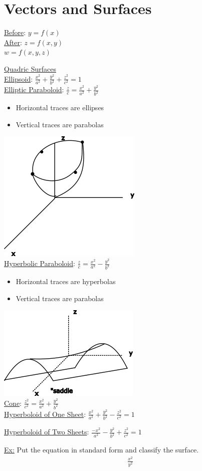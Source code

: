 \documentclass[12pt]{article}
\begin{document}
\section{Vectors and Surfaces}

\underline{Before}: \(y=f(x)\) \\%
\underline{After}: \(z=f(x,y)\) \\%
\(w = f(x,y,z)\) 


\underline{Quadric Surfaces}\\%
\underline{Ellipsoid}: $\frac{x^2}{a^2}+\frac{y^2}{b^2}+\frac{z^2}{c^2}=1$\\%
\underline{Elliptic Paraboloid}: $\frac{z}{c}=\frac{x^2}{a^2}+\frac{y^2}{b^2}$
\begin{itemize}
	\item Horizontal traces are ellipses
	\item Vertical traces are parabolas
\end{itemize}
\includegraphics{parabaloid}\\%
\underline{Hyperbolic Paraboloid}: $\frac{z}{c}=\frac{x^2}{a^2}-\frac{y^2}{b^2}$
\begin{itemize}
	\item Horizontal traces are hyperbolas
	\item Vertical traces are parabolas
\end{itemize}
\includegraphics{saddle}\\%
\underline{Cone}: $\frac{z^2}{c^2}=\frac{x^2}{a^2}+\frac{y^2}{b^2}$\\%
\underline{Hyperboloid of One Sheet}: $\frac{x^2}{a^2}+\frac{y^2}{b^2}-\frac{z^2}{c^2}=1$

\underline{Hyperboloid of Two Sheets}: $\frac{-x^2}{a^2}-\frac{y^2}{b^2}+\frac{z^2}{c^2}=1$\

\underline{Ex:} Put the equation in standard form and classify the surface.
\begin{align}
	\frac{x^2}{y^2}
\end{align}
	
\end{document}
